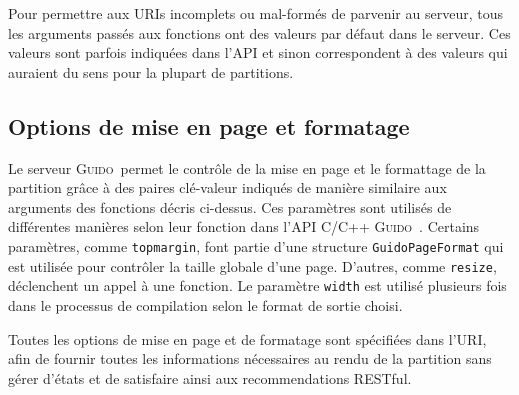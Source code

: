 \documentclass{article}
\newcommand{\guido}		{\textsc{Guido}}
\begin{document}
Pour permettre aux URIs incomplets ou mal-formés de parvenir au serveur, tous les arguments passés aux fonctions ont des valeurs par défaut dans le serveur. Ces valeurs sont parfois indiquées dans l'API et sinon correspondent à des valeurs qui auraient du sens pour la plupart de partitions.

\subsection{Options de mise en page et formatage}

Le serveur \guido\ permet le contrôle de la mise en page et le formattage de la partition grâce à des paires clé-valeur indiqués de manière similaire aux arguments des fonctions décris ci-dessus.
Ces paramètres sont utilisés de différentes manières selon leur fonction dans l'API C/C++ \guido\ . Certains paramètres, comme  \verb=topmargin=, font partie d'une structure \verb=GuidoPageFormat= qui est utilisée pour contrôler la taille globale d'une page. D'autres, comme \verb=resize=, déclenchent un appel à une fonction. Le paramètre \verb=width= est utilisé plusieurs fois dans le processus de compilation selon le format de sortie choisi. 

Toutes les options de mise en page et de formatage sont spécifiées dans l'URI, afin de fournir toutes les informations nécessaires au rendu de la partition sans gérer d'états et de satisfaire ainsi aux recommendations RESTful.
\end{document}
